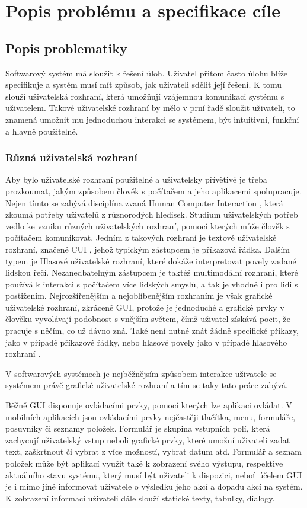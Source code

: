 \chapter{Popis problému a specifikace cíle}
\section{Popis problematiky}

Softwarový systém má sloužit k řešení úloh. Uživatel přitom často úlohu blíže specifikuje a systém musí mít způsob, jak uživateli sdělit její řešení. K tomu slouží uživatelská rozhraní, která umožňují vzájemnou komunikaci systému s uživatelem. Takové uživatelské rozhraní by mělo v prní řadě sloužit uživateli, to znamená umožnit mu jednoduchou interakci se systémem, být intuitivní, funkční a hlavně použitelné. 


\subsection{Různá uživatelská rozhraní}
Aby bylo uživatelské rozhraní použitelné a uživatelsky přívětivé je třeba prozkoumat, jakým způsobem člověk s počítačem a jeho aplikacemi spolupracuje. Nejen tímto se zabývá disciplína zvaná Human Computer Interaction \cite{uiTypes}, která zkoumá potřeby uživatelů z různorodých hledisek. Studium uživatelských potřeb vedlo ke vzniku různých uživatelských rozhraní, pomocí kterých může člověk s počítačem komunikovat. Jedním z takových rozhraní je textové uživatelské rozhraní, značené CUI \cite{uiTypes}, jehož typickým zástupcem je příkazová řádka. Dalším typem je Hlasové uživatelské rozhraní, které dokáže interpretovat povely zadané lidskou řečí.  Nezanedbatelným zástupcem je taktéž multimodální rozhraní, které používá k interakci s počítačem více lidských smyslů, a tak je vhodné i pro lidi s postižením. Nejrozšířenějším a nejoblíbenějším rozhraním je však grafické uživatelské rozhraní, zkráceně GUI, protože je jednoduché a grafické prvky v člověku vyvolávají podobnost s vnějším světem, čímž uživatel získává pocit, že pracuje s něčím, co už dávno zná. Také není nutné znát žádně specifické příkazy, jako v případě příkazové řádky, nebo hlasové povely jako v případě hlasového rozhraní \cite{uiTypes}. 

V softwarových systémech je nejběžnějsím způsobem interakce uživatele se systémem právě grafické uživatelské rozhraní a tím se taky tato práce zabývá. 

Běžně GUI disponuje ovládacími prvky, pomocí kterých lze aplikaci ovládat. V mobilních aplikacích jsou ovládacími prvky nejčastěji tlačítka, menu, formuláře, posuvníky či seznamy položek. Formulář je skupina vstupních polí, která zachycují uživatelský vstup neboli grafické prvky, které umožní uživateli zadat text, zaškrtnout či vybrat z více možností, vybrat datum atd. Formulář a seznam položek může být aplikací využit také k zobrazení svého výstupu, respektive aktuálního stavu systému, který musí být uživateli k dispozici, neboť účelem GUI je i mimo jiné informovat uživatele o výsledku jeho akcí a dopadu akcí na systém. K zobrazení informací uživateli dále slouží statické texty, tabulky, dialogy. 

